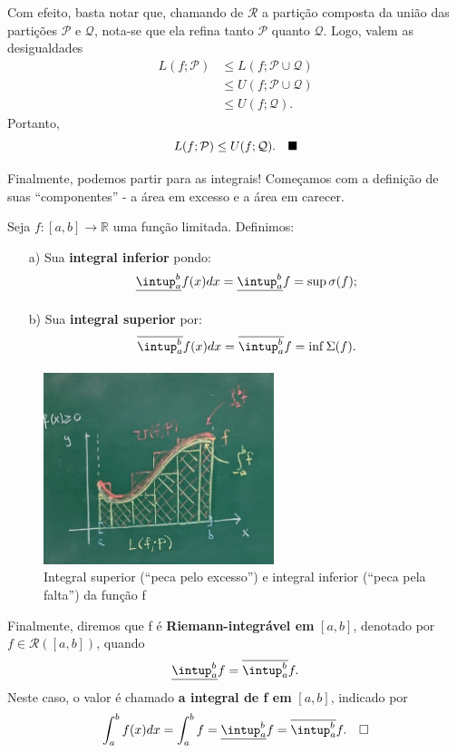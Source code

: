 \documentclass[../analysisII_notes.tex]{subfiles}
\begin{document}
\begin{proof*}
	Com efeito, basta notar que, chamando de \(\mathcal{R}\) a partição composta da união das partições \(\mathcal{P}\) e \(\mathcal{Q}\), nota-se que ela refina tanto \(\mathcal{P}\) quanto \(\mathcal{Q}\). Logo, valem as desigualdades
	\begin{align*}
		L(f; \mathcal{P}) & \leq L(f; \mathcal{P}\cup \mathcal{Q}) \\
		                  & \leq U(f; \mathcal{P}\cup \mathcal{Q}) \\
		                  & \leq U(f; \mathcal{Q}).
	\end{align*}
	Portanto,
	\[
		L(f; \mathcal{P}) \leq U(f; \mathcal{Q}).\quad \text{$\blacksquare$}
	\]
\end{proof*}

Finalmente, podemos partir para as integrais! Começamos com a definição de suas ``componentes'' - a área em excesso e a área em carecer.
\begin{def*}
	Seja \(f:[a, b]\rightarrow \mathbb{R}\) uma função limitada. Definimos:
	\begin{itemize}
		\item[a)] Sua \textbf{integral inferior} pondo:
		      \[
			      \underline{\intup_{a}^{b}}f(x) dx = \underline{\intup_{a}^{b}}f = \sup_{}\sigma (f);
		      \]
		\item[b)] Sua \textbf{integral superior} por:
		      \[
			      \overline{\intup_{a}^{b}}f(x)dx = \overline{\intup_{a}^{b}}f = \inf_{}\Sigma (f).
		      \]
	\end{itemize}
	\begin{figure}[H]
		\begin{center}
			\includegraphics[height=0.6\textheight, width=0.6\textwidth, keepaspectratio]{./Images/ulint_04.png}
		\end{center}
		\caption{Integral superior (``peca pelo excesso'') e integral inferior (``peca pela falta'') da função f}
		\label{ulint04}
	\end{figure}

	Finalmente, diremos que f é \textbf{Riemann-integrável em }\([a, b]\), denotado por \(f\in \mathcal{R}([a, b])\), quando
	\[
		\underline{\intup_{a}^{b}}f = \overline{\intup_{a}^{b}}f.
	\]
	Neste caso, o valor é chamado \textbf{a integral de f em }\([a, b]\), indicado por
	\[
		\int_{a}^{b}f(x)dx = \int_{a}^{b}f = \underline{\intup_{a}^{b}}f = \overline{\intup_{a}^{b}}f.\quad \square
	\]
\end{def*}
\end{document}
